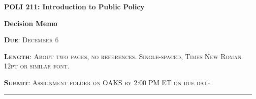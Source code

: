 \documentclass[11pt]{article}
\begin{document}
\begin{center}
\bigskip

{\bf{POLI 211: Introduction to Public Policy}}

{\bf{Decision Memo }}
\end{center} 

\noindent \textsc{{\bf{Due}}: December 6}

\noindent \textsc{{\bf{Length}}: About two pages, no references. Single-spaced, Times New Roman 12pt or similar font.}

\noindent \textsc{{\bf{Submit}}: Assignment folder on OAKS by 2:00 PM ET on due date}


\noindent\rule{\textwidth}{1pt}





  
\end{document}
